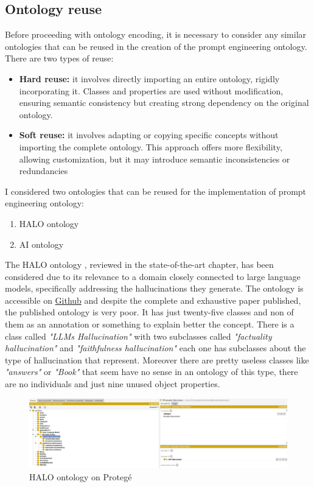 \subsection{Ontology reuse}
Before proceeding with ontology encoding, it is necessary to consider any similar ontologies that can be reused in the creation of the prompt engineering ontology. There are two types of reuse:
\begin{itemize}
    \item \textbf{Hard reuse:} it involves directly importing an entire ontology, rigidly incorporating it. Classes and properties are used without modification, ensuring semantic consistency but creating strong dependency on the original ontology.

    \item \textbf{Soft reuse:} it involves adapting or copying specific concepts without importing the complete ontology. This approach offers more flexibility, allowing customization, but it may introduce semantic inconsistencies or redundancies 
\end{itemize}
I considered two ontologies that can be reused for the implementation of prompt engineering ontology:
\begin{enumerate}
    \item HALO ontology

    \item AI ontology
\end{enumerate}
The HALO ontology \cite{nananukul2024halo}, reviewed in the state-of-the-art chapter, has been considered due to its relevance to a domain closely connected to large language models, specifically addressing the hallucinations they generate. The ontology is accessible on \href{https://github.com/navapatn/halo-ontology}{Github} and despite the complete and exhaustive paper published, the published ontology is very poor. It has just twenty-five classes and non of them as an annotation or something to explain better the concept. There is a class called \textit{"LLMs Hallucination"} with two subclasses called \textit{"factuality hallucination"} and \textit{"faithfulness hallucination"} each one has subclasses about the type of hallucination that represent. Moreover there are pretty useless classes like \textit{"answers"} or \textit{"Book"} that seem have no sense in an ontology of this type, there are no individuals and just nine unused object properties. 
\begin{figure}[H]
    \centering
    \includegraphics[width=1.0\linewidth]{Figures/fig_28.png}
    \caption{HALO ontology on Protegé}
    \label{fig:enter-label}
\end{figure}
